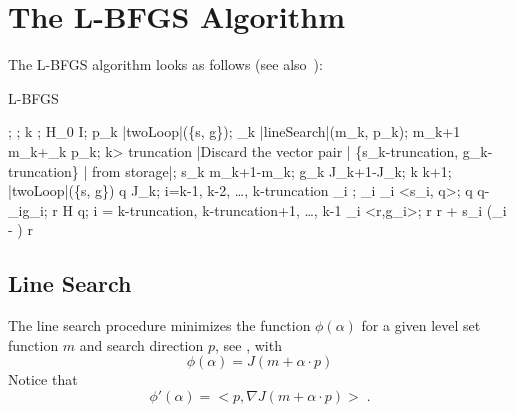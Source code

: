 
\section{The L-BFGS Algorithm}

The L-BFGS algorithm looks as follows (see also~\cite{Nocedal1980}):
\begin{algorithm}
    \mbox{L-BFGS}
    \begin{program}
        \BEGIN
        ;
        ;
        k ;
        H_0 \leftarrow I;
        \WHILE \NOT{} \DO
        p_k \leftarrow |twoLoop|(\{s, g\});
        \alpha_k \leftarrow |lineSearch|(m_k, p_k); 
        m_{k+1} \leftarrow m_k+\alpha_k p_k;
        \IF k> truncation
        \THEN
            |Discard the vector pair | \{s_{k-truncation}, g_{k-truncation}\} | from storage|;
        \FI
        s_k \leftarrow m_{k+1}-m_k;
        g_k \leftarrow \nabla J_{k+1}-\nabla J_k;
        k \leftarrow k+1;
        \OD
        \WHERE
        \FUNCT |twoLoop|(\{s, g\}) \BODY
            \EXP q \leftarrow \nabla J_k;
            \FOR i=k-1, k-2, \ldots, k-truncation \DO
            \rho_i \leftarrow {};
            \alpha_i \leftarrow \rho_i <s_i, q>;
            q \leftarrow q-\alpha_i\cdot  g_i;
            \OD
            r \leftarrow H q;
            \FOR i = k-truncation, k-truncation+1, \ldots, k-1 \DO
            \beta \leftarrow \rho_i \cdot <r,g_i>;
            r \leftarrow r + s_i \cdot (\alpha_i - \beta)
            \OD
            r \ENDEXP \ENDFUNCT
        \END
    \end{program}
\end{algorithm}

\subsection{Line Search}\label{sec:LineSearch}
The line search procedure minimizes the function $\phi(\alpha)$ for a given
level set function $m$ and search direction $p$, see \cite{Nocedal2006},
\cite{MoreThuente1992} with
\begin{equation}\label{EQU:MIN:22}
\phi(\alpha) = J(m+ \alpha \cdot  p)
\end{equation}
Notice that 
\begin{equation}\label{EQU:MIN:23}
\phi'(\alpha) = < p , \nabla J(m+\alpha \cdot p)> \; .
\end{equation}

